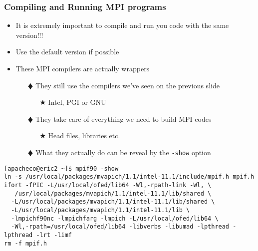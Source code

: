 \documentclass[slidestop,mathserif,compress,xcolor=svgnames,table]{beamer}
\begin{document}
\begin{frame}[fragile]
  \frametitle{\small Compiling and Running MPI programs}
  \begin{itemize}
    \item It is extremely important to compile and run you code with the same version!!!
    \item Use the default version if possible
    \item These MPI compilers are actually wrappers
    \begin{enumerate}
      \item[$\vardiamond$]  They still use the compilers we've seen on the previous slide
      \begin{enumerate}
	\item[$\bigstar$]  Intel, PGI or GNU
      \end{enumerate}
      \item[$\vardiamond$]  They take care of everything we need to build MPI codes
      \begin{enumerate}
	\item[$\bigstar$]  Head files, libraries etc.
      \end{enumerate}
      \item[$\vardiamond$]  What they actually do can be reveal by the \texttt{-show} option
    \end{enumerate}
  \end{itemize}
  {\tiny
  \begin{alertblock}{}
    {%
    \begin{verbatim}
[apacheco@eric2 ~]$ mpif90 -show
ln -s /usr/local/packages/mvapich/1.1/intel-11.1/include/mpif.h mpif.h
ifort -fPIC -L/usr/local/ofed/lib64 -Wl,-rpath-link -Wl, \
   /usr/local/packages/mvapich/1.1/intel-11.1/lib/shared \
  -L/usr/local/packages/mvapich/1.1/intel-11.1/lib/shared \
  -L/usr/local/packages/mvapich/1.1/intel-11.1/lib \
  -lmpichf90nc -lmpichfarg -lmpich -L/usr/local/ofed/lib64 \
  -Wl,-rpath=/usr/local/ofed/lib64 -libverbs -libumad -lpthread -lpthread -lrt -limf
rm -f mpif.h
    \end{verbatim}
    }
  \end{alertblock}
  }
\end{frame}
\end{document}
